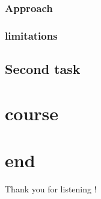 \documentclass[xcolor=dvipsnames]{beamer}
\begin{document}
\subsubsection{Approach}

\begin{frame}



\end{frame}

\subsubsection{limitations}

\begin{frame}

\end{frame}

\subsection{Second task}
\begin{frame}

\end{frame}

\section{course}


\section*{end}

\begin{frame}
\begin{center}
\Huge Thank you for listening !
\end{center}
\end{frame}
\end{document}
